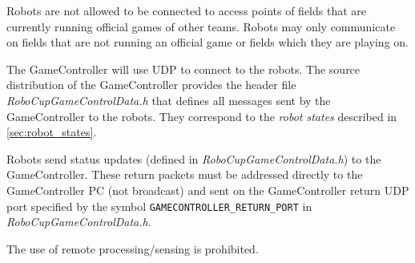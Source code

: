 Robots are not allowed to be connected to access points of fields that are currently running official games of other teams.
Robots may only communicate on fields that are not running an official game or fields which they are playing on.

The GameController will use UDP to connect to the robots. The source distribution of the GameController provides the header file \emph{RoboCupGameControlData.h} that defines all messages sent by the GameController to the robots. They correspond to the \emph{robot states} described in \cref{sec:robot_states}.

Robots send status updates (defined in \emph{RoboCupGameControlData.h}) to the GameController. These return packets must be addressed directly to the GameController PC (\ie not broadcast) and sent on the GameController return UDP port specified by the symbol \verb!GAMECONTROLLER_RETURN_PORT! in \emph{RoboCupGameControlData.h}.

The use of remote processing/sensing is prohibited.
